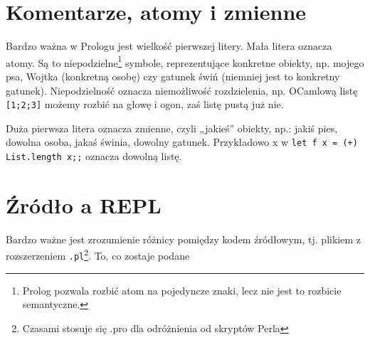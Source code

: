 \documentclass[12pt,a4paper]{article}
\begin{document}
\section{Komentarze, atomy i zmienne}
Bardzo ważna w Prologu jest wielkość pierwszej litery. Mała litera oznacza atomy. Są to niepodzielne\footnote{Prolog pozwala rozbić atom na pojedyncze znaki, lecz nie jest to rozbicie semantyczne.} symbole, reprezentujące konkretne obiekty, np. mojego psa, Wojtka (konkretną osobę) czy gatunek świń (niemniej jest to konkretny gatunek). Niepodzielność oznacza niemożliwość rozdzielenia, np. OCamlową listę \verb![1;2;3]! możemy rozbić na głowę i ogon, zaś listę pustą już nie.

Duża pierwsza litera oznacza zmienne, czyli „jakieś” obiekty, np.: jakiś pies, dowolna osoba, jakaś świnia, dowolny gatunek. Przykładowo x w \verb!let f x = (+) List.length x;;! oznacza dowolną listę.

\section{Źródło a REPL}
Bardzo ważne jest zrozumienie różnicy pomiędzy kodem źródłowym, tj. plikiem z rozszerzeniem \verb+.pl+\footnote{Czasami stosuje się .pro dla odróżnienia od skryptów Perla}. To, co zostaje podane
\end{document}
